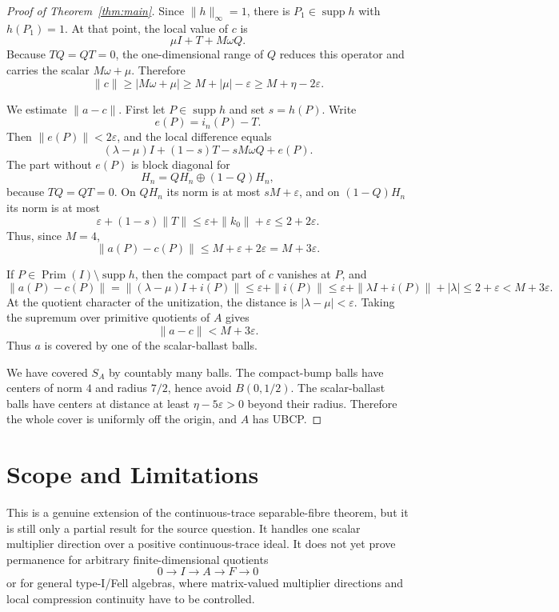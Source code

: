 \documentclass[11pt]{article}
\newcommand{\Prim}{\operatorname{Prim}}
\newcommand{\supp}{\operatorname{supp}}
\begin{document}
\begin{proof}[Proof of Theorem~\ref{thm:main}]
Since \(\|h\|_\infty=1\), there is \(P_1\in\supp h\) with \(h(P_1)=1\).  At
that point, the local value of \(c\) is
\[
        \mu I+T+M\omega Q.
\]
Because \(TQ=QT=0\), the one-dimensional range of \(Q\) reduces this operator
and carries the scalar \(M\omega+\mu\).  Therefore
\[
        \|c\|\ge |M\omega+\mu|
        \ge M+|\mu|-\varepsilon
        \ge M+\eta-2\varepsilon.
\]

We estimate \(\|a-c\|\).  First let \(P\in\supp h\) and set \(s=h(P)\).  Write
\[
        e(P)=i_n(P)-T.
\]
Then \(\|e(P)\|<2\varepsilon\), and the local difference equals
\[
        (\lambda-\mu)I+(1-s)T-sM\omega Q+e(P).
\]
The part without \(e(P)\) is block diagonal for
\[
        H_n=QH_n\oplus(1-Q)H_n,
\]
because \(TQ=QT=0\).  On \(QH_n\) its norm is at most \(sM+\varepsilon\), and
on \((1-Q)H_n\) its norm is at most
\[
        \varepsilon+(1-s)\|T\|
        \le \varepsilon+\|k_0\|+\varepsilon
        \le 2+2\varepsilon.
\]
Thus, since \(M=4\),
\[
        \|a(P)-c(P)\|\le M+\varepsilon+2\varepsilon=M+3\varepsilon.
\]

If \(P\in\Prim(I)\setminus\supp h\), then the compact part of \(c\) vanishes
at \(P\), and
\[
        \|a(P)-c(P)\|
        =
        \|(\lambda-\mu)I+i(P)\|
        \le \varepsilon+\|i(P)\|
        \le \varepsilon+\|\lambda I+i(P)\|+|\lambda|
        \le 2+\varepsilon
        <M+3\varepsilon.
\]
At the quotient character of the unitization, the distance is
\(|\lambda-\mu|<\varepsilon\).  Taking the supremum over primitive quotients of
\(A\) gives
\[
        \|a-c\|<M+3\varepsilon.
\]
Thus \(a\) is covered by one of the scalar-ballast balls.

We have covered \(S_A\) by countably many balls.  The compact-bump balls have
centers of norm \(4\) and radius \(7/2\), hence avoid \(B(0,1/2)\).  The
scalar-ballast balls have centers at distance at least
\(\eta-5\varepsilon>0\) beyond their radius.  Therefore the whole cover is
uniformly off the origin, and \(A\) has UBCP.
\end{proof}

\section*{Scope and Limitations}

This is a genuine extension of the continuous-trace separable-fibre theorem,
but it is still only a partial result for the source question.  It handles one
scalar multiplier direction over a positive continuous-trace ideal.  It does
not yet prove permanence for arbitrary finite-dimensional quotients
\[
        0\to I\to A\to F\to0
\]
or for general type-I/Fell algebras, where matrix-valued multiplier directions
and local compression continuity have to be controlled.
\end{document}
